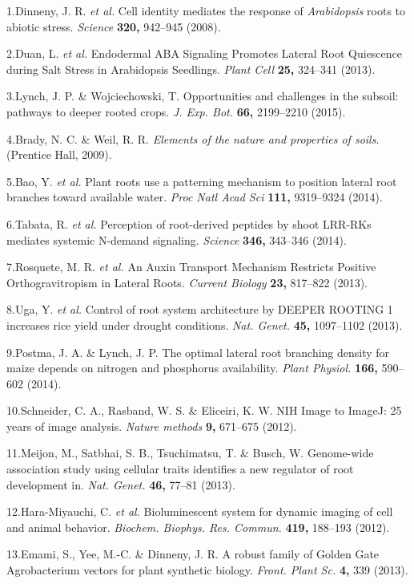 \documentclass[]{article}
\begin{document}
1.Dinneny, J. R. \emph{et al.} Cell identity mediates the response of
\emph{Arabidopsis} roots to abiotic stress. \emph{Science} \textbf{320,}
942--945 (2008).

2.Duan, L. \emph{et al.} Endodermal ABA Signaling Promotes Lateral Root
Quiescence during Salt Stress in Arabidopsis Seedlings. \emph{Plant
Cell} \textbf{25,} 324--341 (2013).

3.Lynch, J. P. \& Wojciechowski, T. Opportunities and challenges in the
subsoil: pathways to deeper rooted crops. \emph{J. Exp. Bot.}
\textbf{66,} 2199--2210 (2015).

4.Brady, N. C. \& Weil, R. R. \emph{Elements of the nature and
properties of soils}. (Prentice Hall, 2009).

5.Bao, Y. \emph{et al.} Plant roots use a patterning mechanism to
position lateral root branches toward available water. \emph{Proc Natl
Acad Sci} \textbf{111,} 9319--9324 (2014).

6.Tabata, R. \emph{et al.} Perception of root-derived peptides by shoot
LRR-RKs mediates systemic N-demand signaling. \emph{Science}
\textbf{346,} 343--346 (2014).

7.Rosquete, M. R. \emph{et al.} An Auxin Transport Mechanism Restricts
Positive Orthogravitropism in Lateral Roots. \emph{Current Biology}
\textbf{23,} 817--822 (2013).

8.Uga, Y. \emph{et al.} Control of root system architecture by DEEPER
ROOTING 1 increases rice yield under drought conditions. \emph{Nat.
Genet.} \textbf{45,} 1097--1102 (2013).

9.Postma, J. A. \& Lynch, J. P. The optimal lateral root branching
density for maize depends on nitrogen and phosphorus availability.
\emph{Plant Physiol.} \textbf{166,} 590--602 (2014).

10.Schneider, C. A., Rasband, W. S. \& Eliceiri, K. W. NIH Image to
ImageJ: 25 years of image analysis. \emph{Nature methods} \textbf{9,}
671--675 (2012).

11.Meijon, M., Satbhai, S. B., Tsuchimatsu, T. \& Busch, W. Genome-wide
association study using cellular traits identifies a new regulator of
root development in. \emph{Nat. Genet.} \textbf{46,} 77--81 (2013).

12.Hara-Miyauchi, C. \emph{et al.} Bioluminescent system for dynamic
imaging of cell and animal behavior. \emph{Biochem. Biophys. Res.
Commun.} \textbf{419,} 188--193 (2012).

13.Emami, S., Yee, M.-C. \& Dinneny, J. R. A robust family of Golden
Gate Agrobacterium vectors for plant synthetic biology. \emph{Front.
Plant Sc.} \textbf{4,} 339 (2013).
\end{document}
